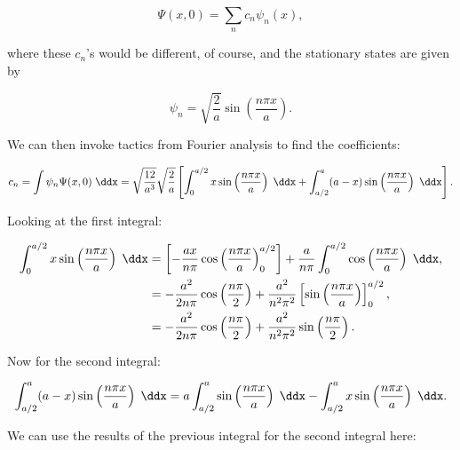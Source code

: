 \begin{parts}
\begin{equation*}
    \Psi(x,0) = \sum_n c_n \psi_n(x),
\end{equation*}

where these $c_n$'s would be different, of course, and the stationary states are given by

\begin{equation*}
    \psi_n = \sqrt{\frac{2}{a}}\sin\left( \frac{n\pi x}{a} \right).
\end{equation*}

We can then invoke tactics from Fourier analysis to find the coefficients:

\begin{equation*}
    c_n = \int \psi_n \Psi(x,0) \;\ddx = \sqrt{\frac{12}{a^3}}\sqrt{\frac{2}{a}} \left[ \int_0^{a/2} x\sin\left( \frac{n\pi x}{a} \right)\;\ddx + \int_{a/2}^a (a-x)\sin\left( \frac{n\pi x}{a} \right)\;\ddx \right].
\end{equation*}

Looking at the first integral:

\begin{align*}
    \int_0^{a/2} x\sin\left( \frac{n\pi x}{a} \right)\;\ddx &= \left[ -\frac{ax}{n\pi}\cos\left( \frac{n\pi x}{a} \right)_0^{a/2} \right] + \frac{a}{n\pi}\int_0^{a/2} \cos\left( \frac{n\pi x}{a} \right)\;\ddx, \\
    &= -\frac{a^2}{2n\pi}\cos\left( \frac{n\pi}{2} \right) + \frac{a^2}{n^2\pi^2}\left[ \sin\left( \frac{n\pi x}{a} \right) \right]_0^{a/2}, \\
    &= -\frac{a^2}{2n\pi}\cos\left( \frac{n\pi}{2} \right) + \frac{a^2}{n^2\pi^2}\sin\left( \frac{n\pi}{2} \right).
\end{align*}

Now for the second integral:

\begin{equation*}
    \int_{a/2}^a (a-x)\sin\left( \frac{n\pi x}{a} \right)\;\ddx = a\int_{a/2}^a \sin\left( \frac{n\pi x}{a} \right)\;\ddx - \int_{a/2}^a x\sin\left( \frac{n\pi x}{a} \right)\;\ddx.
\end{equation*}

We can use the results of the previous integral for the second integral here:


\end{parts}
